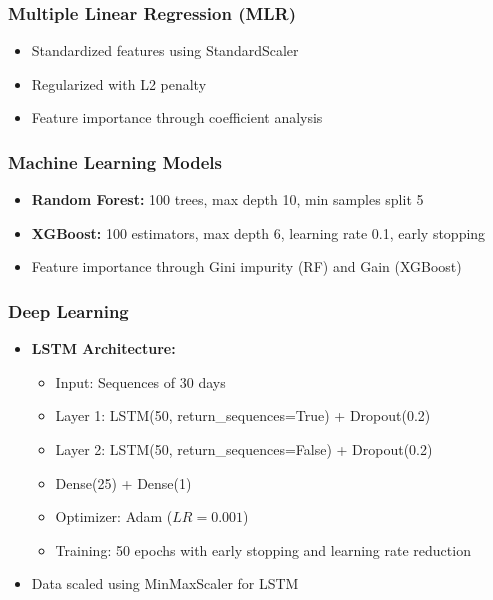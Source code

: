 \documentclass[conference]{IEEEtran}
\begin{document}
\subsubsection{Multiple Linear Regression (MLR)}
\begin{itemize}
    \item Standardized features using StandardScaler
    \item Regularized with L2 penalty
    \item Feature importance through coefficient analysis
\end{itemize}

\subsubsection{Machine Learning Models}
\begin{itemize}
    \item \textbf{Random Forest:} 100 trees, max depth 10, min samples split 5 \cite{b13}
    \item \textbf{XGBoost:} 100 estimators, max depth 6, learning rate 0.1, early stopping \cite{b14}
    \item Feature importance through Gini impurity (RF) and Gain (XGBoost)
\end{itemize}

\subsubsection{Deep Learning}
\begin{itemize}
    \item \textbf{LSTM Architecture:} \cite{b15}
    \begin{itemize}
        \item Input: Sequences of 30 days
        \item Layer 1: LSTM(50, return\_sequences=True) + Dropout(0.2)
        \item Layer 2: LSTM(50, return\_sequences=False) + Dropout(0.2)
        \item Dense(25) + Dense(1)
        \item Optimizer: Adam ($LR=0.001$)
        \item Training: 50 epochs with early stopping and learning rate reduction
    \end{itemize}
    \item Data scaled using MinMaxScaler for LSTM
\end{itemize}
\end{document}
